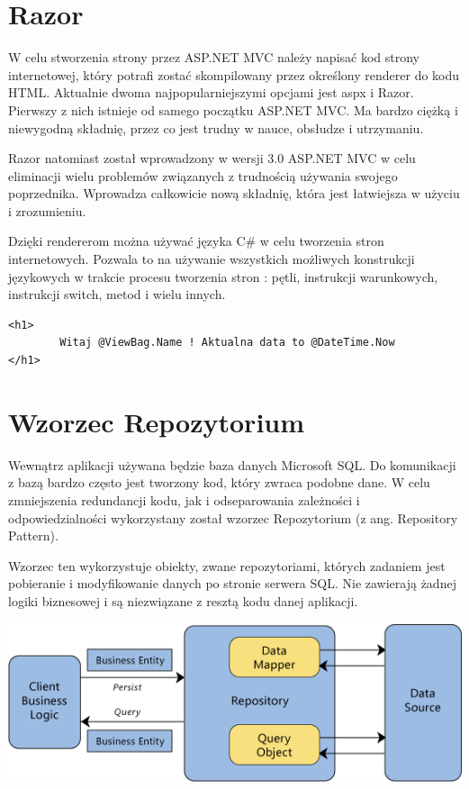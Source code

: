 \section{Razor}

W celu stworzenia strony przez ASP.NET MVC należy napisać kod strony internetowej, który potrafi zostać skompilowany przez określony renderer do kodu HTML. Aktualnie dwoma najpopularniejszymi opcjami jest aspx i Razor\cite{Razor}. Pierwszy z nich istnieje od samego początku ASP.NET MVC. Ma bardzo ciężką i niewygodną składnię, przez co jest trudny w nauce, obsłudze i utrzymaniu.

Razor natomiast został wprowadzony w wersji 3.0 ASP.NET MVC w celu eliminacji wielu problemów związanych z trudnością używania swojego poprzednika. Wprowadza całkowicie nową składnię, która jest łatwiejsza w użyciu i zrozumieniu. 

Dzięki rendererom można używać języka C\# w celu tworzenia stron internetowych. Pozwala to na używanie wszystkich możliwych konstrukcji językowych w trakcie procesu tworzenia stron : pętli, instrukcji warunkowych, instrukcji switch, metod i wielu innych.

\begin{minipage}{\linewidth}
\begin{lstlisting}[frame=single, numbers=none,captionpos=b, 
caption={Przykładowy kod kompatybilny z Razorem.}]
<h1>
        Witaj @ViewBag.Name ! Aktualna data to @DateTime.Now 
</h1>
\end{lstlisting}
\end{minipage}

\section{Wzorzec Repozytorium}
\label{section_Repo}
Wewnątrz aplikacji używana będzie baza danych Microsoft SQL. Do komunikacji z bazą bardzo często jest tworzony kod, który zwraca podobne dane. W celu zmniejszenia redundancji kodu, jak i odseparowania zależności i odpowiedzialności wykorzystany został wzorzec Repozytorium (z ang. Repository Pattern)\cite{RepositoryUnitOfWorkPattern}.

Wzorzec ten wykorzystuje obiekty, zwane repozytoriami, których zadaniem jest pobieranie i modyfikowanie danych po stronie serwera SQL. Nie zawierają żadnej logiki biznesowej i są niezwiązane z resztą kodu danej aplikacji. 

\begin{center}
	\includegraphics[width=\textwidth]{images/RepositoryPattern.png}
\end{center}

